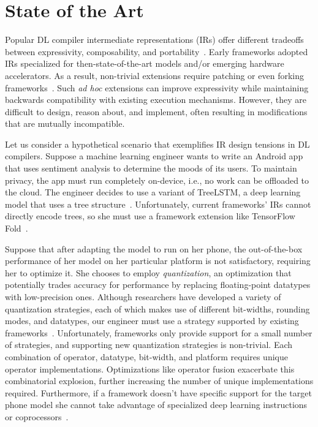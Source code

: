 \section{State of the Art}

Popular DL compiler intermediate representations (IRs) offer different tradeoffs
  between expressivity, composability, and portability~\citep{
    tensorflow, pytorch_ad, chainer_learningsys2015, tangent, theano, glow}.
Early frameworks adopted IRs
  specialized for then-state-of-the-art models and/or
  emerging hardware accelerators.
As a result, non-trivial extensions require
  patching or even forking frameworks~\citep{
    tf_fold, tf_lite, tangent, tf_eager, xla, glow, torchscript}.
Such \textit{ad hoc} extensions can improve expressivity
  while maintaining backwards compatibility with existing execution mechanisms.
However, they are difficult to design, reason about, and implement,
  often resulting in modifications that are mutually incompatible.

Let us consider a hypothetical scenario that exemplifies
  IR design tensions in DL compilers.
Suppose a machine learning engineer wants to write
  an Android app that uses sentiment analysis to
  determine the moods of its users.
To maintain privacy, the app must run completely on-device,
  i.e., no work can be offloaded to the cloud.
The engineer decides to use a variant of TreeLSTM,
  a deep learning model that uses a tree structure~\citep{tree_lstm}.
Unfortunately, current frameworks' IRs cannot directly encode trees,
  so she must use a framework extension
  like TensorFlow Fold~\citep{tensorflowfold}.

Suppose that after adapting the model to run on her phone,
  the out-of-the-box performance of her
  model on her particular platform is not satisfactory, requiring her to optimize it.
She chooses to employ \textit{quantization}, an optimization that
  potentially trades accuracy for performance by replacing
  floating-point datatypes with low-precision ones.
Although researchers have developed a variety of quantization
  strategies, each of which makes use of different bit-widths, rounding
  modes, and datatypes, our engineer must use a strategy supported
  by existing frameworks~\citep{gustafson2015end, tf_lite_ops_compat, glow_quant}.
Unfortunately, frameworks only provide support for a small number
  of strategies, and supporting new quantization strategies is non-trivial.
Each combination of operator, datatype, bit-width, and
  platform requires unique operator implementations.
Optimizations like operator fusion exacerbate this combinatorial explosion,
  further increasing
  the number of unique implementations required.
Furthermore, if a framework doesn't have specific support for
  the target phone model she cannot take advantage of specialized deep learning
  instructions or coprocessors~\citep{apple_neural_engine}.


